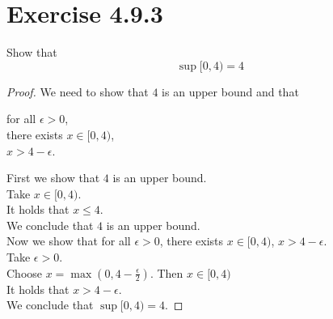 \documentclass{article}
\theoremstyle{mytheoremstyle}
\theoremstyle{mytheoremstyle}
\theoremstyle{myproblemstyle}
\begin{document}
    \section{Exercise 4.9.3}
    \begin{problem}
        Show that
        $$\sup[0,4) = 4$$
    \end{problem}
    \begin{proof}
        We need to show that $4$ is an upper bound and that
        \begin{center}
            for all $\epsilon > 0$, \\
            there exists $x \in [0,4)$, \\
            $x > 4 - \epsilon$.
        \end{center}

        First we show that $4$ is an upper bound. \\
        Take $x \in [0,4)$. \\
        It holds that $x \le 4$. \\
        We conclude that $4$ is an upper bound. \\

        Now we show that for all $\epsilon > 0$, there exists $x \in [0,4)$, $x > 4 - \epsilon$. \\
        Take $\epsilon > 0$. \\
        Choose $x = \max(0, 4 - \frac{\epsilon}{2})$. Then $x \in [0,4)$ \\
        It holds that $x > 4 - \epsilon$. \\
        We conclude that $\sup [0,4) = 4$.
    \end{proof}

    \newpage
\end{document}
